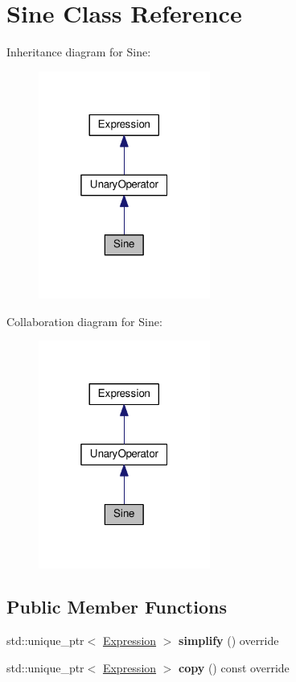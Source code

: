 \hypertarget{classSine}{}\section{Sine Class Reference}
\label{classSine}


Inheritance diagram for Sine\+:\nopagebreak
\begin{figure}[H]
\begin{center}
\leavevmode
\includegraphics[width=160pt]{classSine__inherit__graph}
\end{center}
\end{figure}


Collaboration diagram for Sine\+:\nopagebreak
\begin{figure}[H]
\begin{center}
\leavevmode
\includegraphics[width=160pt]{classSine__coll__graph}
\end{center}
\end{figure}
\subsection*{Public Member Functions}
\begin{DoxyCompactItemize}
\item 
std\+::unique\+\_\+ptr$<$ \hyperlink{classExpression}{Expression} $>$ {\bfseries simplify} () override\hypertarget{classSine_aa73d2639c69872f1122ce69d34d8b24a}{}\label{classSine_aa73d2639c69872f1122ce69d34d8b24a}

\item 
std\+::unique\+\_\+ptr$<$ \hyperlink{classExpression}{Expression} $>$ {\bfseries copy} () const override\hypertarget{classSine_a7ccf9722853bfd11a9bd40746b39c992}{}\label{classSine_a7ccf9722853bfd11a9bd40746b39c992}

\end{DoxyCompactItemize}
